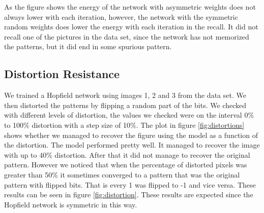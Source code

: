 \documentclass[a4paper]{article}
\begin{document}
As the figure shows the energy of the network with asymmetric weights does not always lower with each iteration, however, the network with the symmetric random weights does lower the energy with each iteration in the recall. It did not recall one of the pictures in the data set, since the network has not memorized the patterns, but it did end in some spurious pattern.

\subsection{Distortion Resistance}
We trained a Hopfield network using images 1, 2 and 3 from the data set. We then distorted the patterns by flipping a random part of the bits. We checked with different levels of distortion, the values we checked were on the interval 0\% to 100\% distortion with a step size of 10\%. The plot in figure \ref{fig:distortions} shows whether we managed to recover the figure using the model as a function of the distortion. The model performed pretty well. It managed to recover the image with up to 40\% distortion. After that it did not manage to recover the original pattern. However we noticed that when the percentage of distorted pixels was greater than 50\% it sometimes converged to a pattern that was the original pattern with flipped bits. That is every 1 was flipped to -1 and vice versa. These results can be seen in figure \ref{fig:distortion}. These results are expected since the Hopfield network is symmetric in this way.
\end{document}
